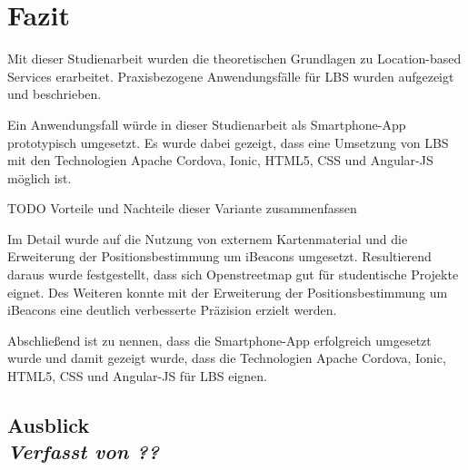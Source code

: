 \newpage
\section{Fazit}


Mit dieser Studienarbeit wurden die theoretischen Grundlagen zu Location-based Services erarbeitet. 
Praxisbezogene Anwendungsfälle für LBS wurden aufgezeigt und beschrieben.

Ein Anwendungsfall würde in dieser Studienarbeit als Smartphone-App prototypisch umgesetzt. 
Es wurde dabei gezeigt, dass eine Umsetzung von LBS mit den Technologien Apache Cordova, Ionic, HTML5, CSS und Angular-JS möglich ist. 

TODO Vorteile und Nachteile dieser Variante zusammenfassen

Im Detail wurde auf die Nutzung von externem Kartenmaterial und die Erweiterung der Positionsbestimmung um iBeacons umgesetzt.
Resultierend daraus wurde festgestellt, dass sich Openstreetmap gut für studentische Projekte eignet. Des Weiteren konnte mit der Erweiterung der Positionsbestimmung um iBeacons eine deutlich verbesserte Präzision erzielt werden. 

Abschließend ist zu nennen, dass die Smartphone-App erfolgreich umgesetzt wurde und damit gezeigt wurde, dass die Technologien Apache Cordova, Ionic, HTML5, CSS und Angular-JS für LBS eignen.


\subsection[Ausblick]{Ausblick
 \\ \textnormal{\small{\textit {Verfasst von ??}}}}
 
